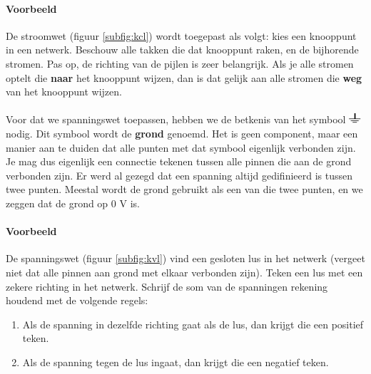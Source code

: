 \documentclass{article}
\begin{document}
\paragraph*{Voorbeeld}
De stroomwet (figuur \ref{subfig:kcl}) wordt toegepast als volgt: kies een knooppunt in een netwerk. Beschouw alle takken die dat knooppunt raken, en de bijhorende stromen. Pas op, de richting van de pijlen is zeer belangrijk. Als je alle stromen optelt die \textbf{naar} het knooppunt wijzen, dan is dat gelijk aan alle stromen die \textbf{weg} van het knooppunt wijzen.

\paragraph*{}
Voor dat we spanningswet toepassen, hebben we de betkenis van het symbool \includegraphics[height=1em]{gnd.pdf} nodig. Dit symbool wordt de \textbf{grond} genoemd. Het is geen component, maar een manier aan te duiden dat alle punten met dat symbool eigenlijk verbonden zijn. Je mag dus eigenlijk een connectie tekenen tussen alle pinnen die aan de grond verbonden zijn. Er werd al gezegd dat een spanning altijd gedifinieerd is tussen twee punten. Meestal wordt de grond gebruikt als een van die twee punten, en we zeggen dat de grond op 0 V is.

\paragraph*{Voorbeeld}
De spanningswet (figuur \ref{subfig:kvl}) vind een gesloten lus in het netwerk (vergeet niet dat alle pinnen aan grond met elkaar verbonden zijn). Teken een lus met een zekere richting in het netwerk. Schrijf de som van de spanningen rekening houdend met de volgende regels:

\begin{enumerate}
 	\item Als de spanning in dezelfde richting gaat als de lus, dan krijgt die een positief teken.
 	\item Als de spanning tegen de lus ingaat, dan krijgt die een negatief teken.
 \end{enumerate}  
\end{document}
